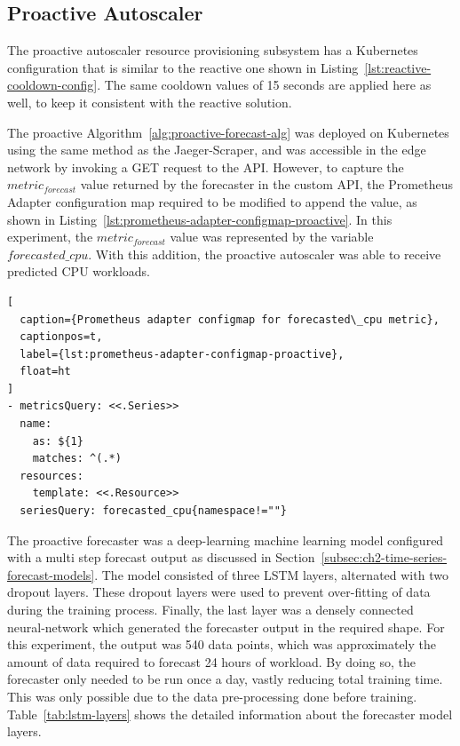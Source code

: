 \subsection{Proactive Autoscaler}
\label{subsec:ch5-proactive-auto-subsection}

The proactive autoscaler resource provisioning subsystem has a Kubernetes configuration that is similar to the reactive one shown in Listing~\ref{lst:reactive-cooldown-config}. The same cooldown values of 15 seconds are applied here as well, to keep it consistent with the reactive solution.\par

The proactive Algorithm~\ref{alg:proactive-forecast-alg} was deployed on Kubernetes using the same method as the Jaeger-Scraper, and was accessible in the edge network by invoking a GET request to the API. However, to capture the $metric_{forecast}$ value returned by the forecaster in the custom API, the Prometheus Adapter configuration map required to be modified to append the value, as shown in Listing~\ref{lst:prometheus-adapter-configmap-proactive}. In this experiment, the $metric_{forecast}$ value was represented by the variable $forecasted\_cpu$. With this addition, the proactive autoscaler was able to receive predicted CPU workloads.\par

\begin{lstlisting}[
  caption={Prometheus adapter configmap for forecasted\_cpu metric},
  captionpos=t,
  label={lst:prometheus-adapter-configmap-proactive},
  float=ht
]
- metricsQuery: <<.Series>>
  name:
    as: ${1}
    matches: ^(.*)
  resources:
    template: <<.Resource>>
  seriesQuery: forecasted_cpu{namespace!=""}
\end{lstlisting}

The proactive forecaster was a deep-learning machine learning model configured with a multi step forecast output as discussed in Section~\ref{subsec:ch2-time-series-forecast-models}. The model consisted of three LSTM layers, alternated with two dropout layers. These dropout layers were used to prevent over-fitting of data during the training process. Finally, the last layer was a densely connected neural-network which generated the forecaster output in the required shape. For this experiment, the output was 540 data points, which was approximately the amount of data required to forecast 24 hours of workload. By doing so, the forecaster only needed to be run once a day, vastly reducing total training time. This was only possible due to the data pre-processing done before training. Table~\ref{tab:lstm-layers} shows the detailed information about the forecaster model layers.\par

